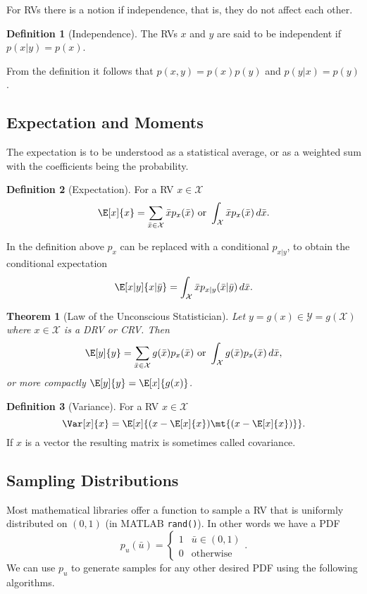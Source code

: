 \documentclass[margin=tiny]{hsrzf}
\theoremstyle{plain}
\newtheorem{thm}{Theorem}[section]
\theoremstyle{definition}
\newtheorem{defn}{Definition}[section]
\theoremstyle{remark}
\begin{document}
For RVs there is a notion if independence, that is, they do not affect each
other.

\begin{defn}[Independence]
  The RVs $x$ and $y$ are said to be independent if $p(x|y) = p(x)$.
\end{defn}

From the definition it follows that $p(x,y) = p(x)p(y)$ and $p(y|x) = p(y)$.

\subsection{Expectation and Moments}

The expectation is to be understood as a statistical average, or as a weighted
sum with the coefficients being the probability.

\begin{defn}[Expectation]
  For a RV $x \in \mathcal{X}$
  \[
    \E[x]{x}
       = \sum_{\bar{x} \in \mathcal{X}} \bar{x} p_x(\bar{x})
       \text{ or }
       \int_\mathcal{X} \bar{x} p_x(\bar{x}) \, d\bar{x}.
  \]
\end{defn}

In the definition above $p_x$ can be replaced with a conditional $p_{x|y}$, to
obtain the conditional expectation
\[
  \E[x|y]{x | \bar{y}} 
    = \int_\mathcal{X} \bar{x} p_{x|y}(\bar{x} | \bar{y}) \, d\bar{x}.
\]

\begin{thm}[Law of the Unconscious Statistician]
  Let $y = g(x) \in \mathcal{Y} = g(\mathcal{X})$ where $x \in \mathcal{X}$ is
  a DRV or CRV. Then
  \[
    \E[y]{y} = \sum_{\bar{x} \in \mathcal{X}} g(\bar{x}) p_x(\bar{x})
      \text{ or }
      \int_\mathcal{X} g(\bar{x}) p_x(\bar{x}) \, d\bar{x},
  \]
  or more compactly $\E[y]{y} = \E[x]{g(x)}$.
\end{thm}

\begin{defn}[Variance]
  For a RV $x \in \mathcal{X}$
  \[
    \Var[x]{x} = \E[x]{(x - \E[x]{x})\mt{(x - \E[x]{x})}}.
  \]
  If $x$ is a vector the resulting matrix is sometimes called covariance.
\end{defn}

\subsection{Sampling Distributions}

Most mathematical libraries offer a function to sample a RV that is uniformly
distributed on $(0,1)$ (in MATLAB \texttt{rand()}). In other words we have a
PDF
\[
  p_u(\bar{u}) = \begin{cases}
    1 & \bar{u} \in (0,1) \\
    0 & \text{otherwise}
  \end{cases}.
\]
We can use $p_u$ to generate samples for any other desired PDF using the
following algorithms.
\end{document}
